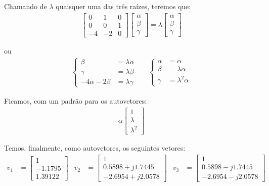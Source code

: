 \documentclass[11pt]{article}
\begin{document}
Chamando de $\lambda$ quaisquer uma das três raízes, teremos que:
\begin{align*}
  \begin{bmatrix}
    0 & 1 & 0\\
    0 & 0 & 1\\
    -4 & -2 & 0
  \end{bmatrix}
  \begin{bmatrix}
    \alpha\\
    \beta\\
    \gamma
  \end{bmatrix}
  =
  \lambda
  \begin{bmatrix}
    \alpha\\
    \beta\\
    \gamma
  \end{bmatrix}
\end{align*}

ou
\begin{align*}
  \begin{cases}
    \beta  &= \lambda \alpha\\
    \gamma &= \lambda \beta\\
    -4\alpha - 2\beta &= \lambda \gamma
  \end{cases}
  &
  &
  \begin{cases}
    \alpha &= \alpha\\
    \beta  &= \lambda \alpha\\
    \gamma &= \lambda^2 \alpha
  \end{cases}
\end{align*}

Ficamos, com um padrão para os autovetores:
\begin{align*}
  \alpha
  \begin{bmatrix}
    1\\
    \lambda\\
    \lambda^2
  \end{bmatrix}
\end{align*}

Temos, finalmente, como autovetores, os seguintes vetores:
\begin{align*}
  v_1 &=
  \begin{bmatrix}
    1\\
    -1.1795\\
    1.39122
  \end{bmatrix}
  &
  v_2 &=
  \begin{bmatrix}
    1\\
    0.5898 + j 1.7445\\
    -2.6954 + j 2.0578
  \end{bmatrix}
  &
  v_3 &=
  \begin{bmatrix}
    1\\
    0.5898 - j 1.7445\\
    -2.6954 - j 2.0578
  \end{bmatrix}
\end{align*}
\end{document}
